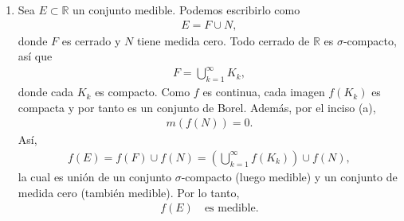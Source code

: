 \begin{solucion}
\begin{enumerate}
\begin{align*}
m\!\left(\bigcup_{j=1}^{\infty}[f(m_{j}),f(M_{j})]\right)
\leq \sum_{j=1}^{\infty}|f(M_{j})-f(m_{j})|
<\epsilon,
\end{align*}
porque, por lo demostrado arriba,
\begin{align*}
  \sum_{j}|M_{j}-m_{j}|\leq \sum_{j}(b_{j}-a_{j})<\delta \quad\Longrightarrow\quad \sum_{j}|f(M_{j})-f(m_{j})|<\epsilon
\end{align*}
por continuidad absoluta de $f$.  
Como esto vale para todo $\epsilon>0$, se concluye que
\begin{align*}
  m(f(E))=0, 
\end{align*}
es decir, $f$ envía conjuntos de medida cero en conjuntos de medida cero.
\item Sea $E\subset\mathbb{R}$ un conjunto medible. Podemos escribirlo como
\begin{align*}
  E=F\cup N, 
\end{align*}
donde $F$ es cerrado y $N$ tiene medida cero. Todo cerrado de $\mathbb{R}$ es $\sigma$-compacto, así que
\begin{align*}
  F=\bigcup_{k=1}^{\infty}K_{k}, 
\end{align*}
donde cada $K_{k}$ es compacto. Como $f$ es continua, cada imagen $f(K_{k})$ es compacta y por tanto es un conjunto de Borel. Además, por el inciso (a),
\begin{align*}
  m(f(N))=0. 
\end{align*}
Así,
\begin{align*}
  f(E)=f(F)\cup f(N)=\left(\bigcup_{k=1}^{\infty}f(K_{k})\right)\cup f(N), 
\end{align*}
la cual es unión de un conjunto $\sigma$-compacto (luego medible) y un conjunto de medida cero (también medible). Por lo tanto,
\begin{align*}
  f(E)\quad\text{es medible.} 
\end{align*}
\end{enumerate}
\end{solucion}

